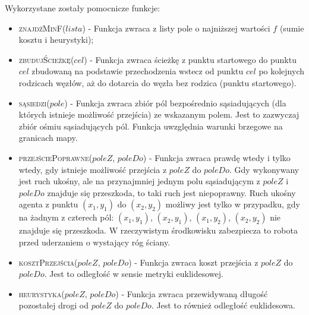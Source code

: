Wykorzystane zostały pomocnicze funkcje:
\begin{itemize}
	\item \textsc{znajdźMinF}($lista$) - Funkcja zwraca z listy pole o najniższej wartości $f$ (sumie kosztu i heurystyki);
	\item \textsc{zbudujŚcieżkę}($cel$) - Funkcja zwraca ścieżkę z punktu startowego do punktu $cel$ zbudowaną na podstawie przechodzenia wstecz od punktu $cel$ po kolejnych rodzicach węzłów, aż do dotarcia do węzła bez rodzica (punktu startowego).
	\item \textsc{sąsiedzi}($pole$) - Funkcja zwraca zbiór pól bezpośrednio sąsiadujących (dla których istnieje możliwość przejścia) ze wskazanym polem. Jest to zazwyczaj zbiór ośmiu sąsiadujących pól. Funkcja uwzględnia warunki brzegowe na granicach mapy.
	\item \textsc{przejściePoprawne}($poleZ$, $poleDo$) - Funkcja zwraca prawdę wtedy i tylko wtedy, gdy istnieje możliwość przejścia z $poleZ$ do $poleDo$. Gdy wykonywany jest ruch ukośny, ale na przynajmniej jednym polu sąsiadującym z $poleZ$ i $poleDo$ znajduje się przeszkoda, to taki ruch jest niepoprawny. Ruch ukośny agenta z punktu $(x_1, y_1)$ do $(x_2, y_2)$ możliwy jest tylko w przypadku, gdy na żadnym z czterech pól: $(x_1, y_1)$, $(x_2, y_1)$, $(x_1, y_2)$, $(x_2, y_2)$ nie znajduje się przeszkoda. W rzeczywistym środkowisku zabezpiecza to robota przed uderzaniem o wystający róg ściany.
	\item \textsc{kosztPrzejścia}($poleZ$, $poleDo$) - Funkcja zwraca koszt przejścia z $poleZ$ do $poleDo$. Jest to odległość w sensie metryki euklidesowej.
	\item \textsc{heurystyka}($poleZ$, $poleDo$) - Funkcja zwraca przewidywaną długość pozostałej drogi od $poleZ$ do $poleDo$. Jest to również odległość euklidesowa.
\end{itemize}

